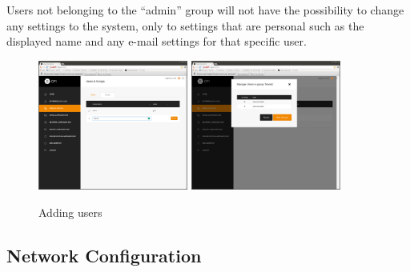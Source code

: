 \documentclass[12pt,a4paper,titlepage]{article}
\begin{document}
Users not belonging to the ``admin'' group will not have the possibility to change any settings to the system, only to settings that are personal such as the displayed name and any e-mail settings for that specific user.
\begin{figure}[h!]
\centering
\includegraphics[width=4.93cm]{./img/groups-1}
\includegraphics[width=4.93cm]{./img/groups-2}
\caption{Adding users}
\end{figure}
\newpage
\subsection{Network Configuration}
\end{document}

